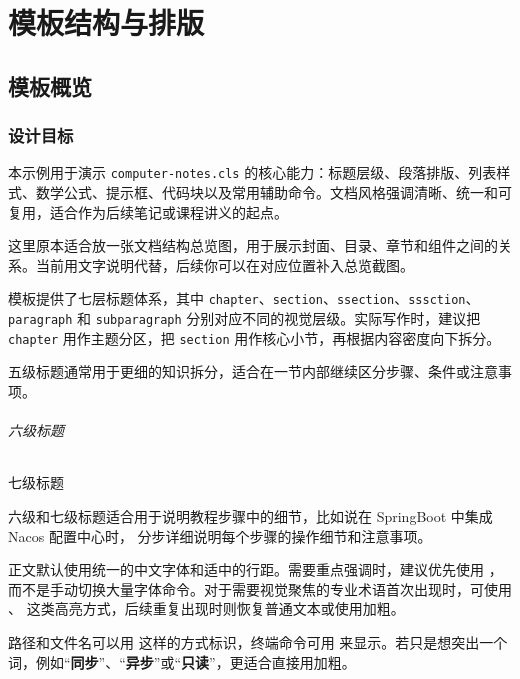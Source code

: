 \documentclass{computer-notes}
\begin{document}
\makecover
\tableofcontents
\newpage

\part{模板结构与排版}

\chapter{模板概览}

\section{设计目标}
本示例用于演示 \texttt{computer-notes.cls} 的核心能力：标题层级、段落排版、列表样式、数学公式、提示框、代码块以及常用辅助命令。文档风格强调清晰、统一和可复用，适合作为后续笔记或课程讲义的起点。

这里原本适合放一张文档结构总览图，用于展示封面、目录、章节和组件之间的关系。当前用文字说明代替，后续你可以在对应位置补入总览截图。

模板提供了七层标题体系，其中 \texttt{chapter}、\texttt{section}、\texttt{ssection}、\texttt{sssction}、\texttt{paragraph} 和 \texttt{subparagraph} 分别对应不同的视觉层级。实际写作时，建议把 \texttt{chapter} 用作主题分区，把 \texttt{section} 用作核心小节，再根据内容密度向下拆分。

五级标题通常用于更细的知识拆分，适合在一节内部继续区分步骤、条件或注意事项。

\paragraph{六级标题}

\subparagraph{七级标题}
六级和七级标题适合用于说明教程步骤中的细节，比如说在 SpringBoot 中集成 Nacos 配置中心时，
分步详细说明每个步骤的操作细节和注意事项。

正文默认使用统一的中文字体和适中的行距。需要重点强调时，建议优先使用 ，而不是手动切换大量字体命令。对于需要视觉聚焦的专业术语首次出现时，可使用 、 这类高亮方式，后续重复出现时则恢复普通文本或使用加粗。

路径和文件名可以用  这样的方式标识，终端命令可用  来显示。若只是想突出一个词，例如“\textbf{同步}”、“\textbf{异步}”或“\textbf{只读}”，更适合直接用加粗。
\end{document}

